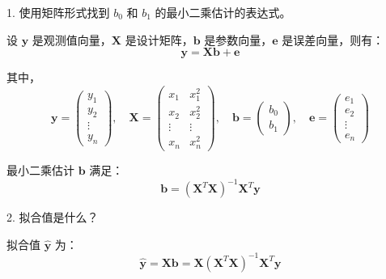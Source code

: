 \documentclass[UTF8]{article}
\theoremstyle{MyLineTheoremStyle} %
\theoremstyle{MyBlockTheoremStyle} %
\theoremstyle{MySubsubsectionStyle} %
\begin{document}
1. 使用矩阵形式找到 $b_0$ 和 $b_1$ 的最小二乘估计的表达式。

设 $\mathbf{y}$ 是观测值向量，$\mathbf{X}$ 是设计矩阵，$\mathbf{b}$ 是参数向量，$\mathbf{e}$ 是误差向量，则有：
\[
\mathbf{y} = \mathbf{X} \mathbf{b} + \mathbf{e}
\]

其中，
\[
\mathbf{y} = \begin{pmatrix} y_1 \\ y_2 \\ \vdots \\ y_n \end{pmatrix}, \quad \mathbf{X} = \begin{pmatrix} x_1 & x_1^2 \\ x_2 & x_2^2 \\ \vdots & \vdots \\ x_n & x_n^2 \end{pmatrix}, \quad \mathbf{b} = \begin{pmatrix} b_0 \\ b_1 \end{pmatrix}, \quad \mathbf{e} = \begin{pmatrix} e_1 \\ e_2 \\ \vdots \\ e_n \end{pmatrix}
\]

最小二乘估计 $\mathbf{b}$ 满足：
\[
\mathbf{b} = (\mathbf{X}^T \mathbf{X})^{-1} \mathbf{X}^T \mathbf{y}
\]

2. 拟合值是什么？

拟合值 $\hat{\mathbf{y}}$ 为：
\[
\hat{\mathbf{y}} = \mathbf{X} \mathbf{b} = \mathbf{X} (\mathbf{X}^T \mathbf{X})^{-1} \mathbf{X}^T \mathbf{y}
\]
\end{document}
